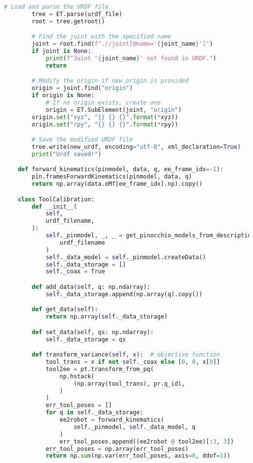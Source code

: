 \begin{lstlisting}[language=python, caption=\raggedright{calibration/tool\_calibration.py}, frame=single]
        # Load and parse the URDF file
        tree = ET.parse(urdf_file)
        root = tree.getroot()

        # Find the joint with the specified name
        joint = root.find(f".//joint[@name='{joint_name}']")
        if joint is None:
            print(f"Joint '{joint_name}' not found in URDF.")
            return

        # Modify the origin if new_origin is provided
        origin = joint.find("origin")
        if origin is None:
            # If no origin exists, create one
            origin = ET.SubElement(joint, "origin")
        origin.set("xyz", "{} {} {}".format(*xyz))
        origin.set("rpy", "{} {} {}".format(*rpy))

        # Save the modified URDF file
        tree.write(new_urdf, encoding="utf-8", xml_declaration=True)
        print("Urdf saved!")

    def forward_kinematics(pinmodel, data, q, ee_frame_idx=-1):
        pin.framesForwardKinematics(pinmodel, data, q)
        return np.array(data.oMf[ee_frame_idx].np).copy()

    class ToolCalibration:
        def __init__(
            self,
            urdf_filename,
        ):
            self._pinmodel, _, _ = get_pinocchio_models_from_description(
                urdf_filename
            )
            self._data_model = self._pinmodel.createData()
            self._data_storage = []
            self._coax = True

        def add_data(self, q: np.ndarray):
            self._data_storage.append(np.array(q).copy())

        def get_data(self):
            return np.array(self._data_storage)

        def set_data(self, qs: np.ndarray):
            self._data_storage = qs

        def transform_variance(self, x):  # objective function
            tool_trans = x if not self._coax else [0, 0, x[0]]
            tool2ee = pt.transform_from_pq(
                np.hstack(
                    (np.array(tool_trans), pr.q_id),
                )
            )
            err_tool_poses = []
            for q in self._data_storage:
                ee2robot = forward_kinematics(
                    self._pinmodel, self._data_model, q
                )
                err_tool_poses.append((ee2robot @ tool2ee)[:3, 3])
            err_tool_poses = np.array(err_tool_poses)
            return np.sum(np.var(err_tool_poses, axis=0, ddof=1))


\end{lstlisting}
